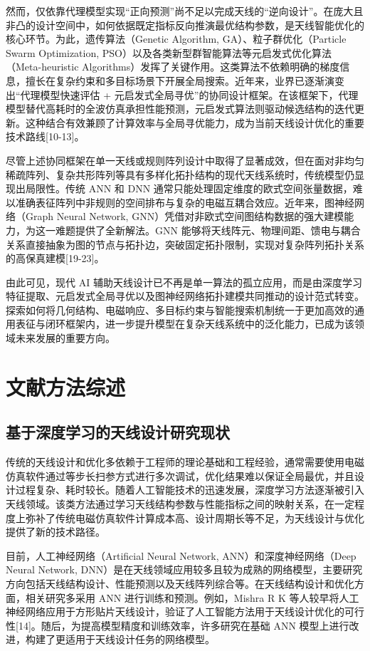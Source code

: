 \documentclass[UTF8,a4paper,12pt]{ctexart}
\begin{document}
然而，仅依靠代理模型实现“正向预测”尚不足以完成天线的“逆向设计”。在庞大且非凸的设计空间中，如何依据既定指标反向推演最优结构参数，是天线智能优化的核心环节。为此，遗传算法（Genetic Algorithm, GA）、粒子群优化（Particle Swarm Optimization, PSO）以及各类新型群智能算法等元启发式优化算法（Meta-heuristic Algorithms）发挥了关键作用。这类算法不依赖明确的梯度信息，擅长在复杂约束和多目标场景下开展全局搜索。近年来，业界已逐渐演变出“代理模型快速评估 + 元启发式全局寻优”的协同设计框架。在该框架下，代理模型替代高耗时的全波仿真承担性能预测，元启发式算法则驱动候选结构的迭代更新。这种结合有效兼顾了计算效率与全局寻优能力，成为当前天线设计优化的重要技术路线[10-13]。

尽管上述协同框架在单一天线或规则阵列设计中取得了显著成效，但在面对非均匀稀疏阵列、复杂共形阵列等具有多样化拓扑结构的现代天线系统时，传统模型仍显现出局限性。传统 ANN 和 DNN 通常只能处理固定维度的欧式空间张量数据，难以准确表征阵列中非规则的空间排布与复杂的电磁互耦合效应。近年来，图神经网络（Graph Neural Network, GNN）凭借对非欧式空间图结构数据的强大建模能力，为这一难题提供了全新解法。GNN 能够将天线阵元、物理间距、馈电与耦合关系直接抽象为图的节点与拓扑边，突破固定拓扑限制，实现对复杂阵列拓扑关系的高保真建模[19-23]。

由此可见，现代 AI 辅助天线设计已不再是单一算法的孤立应用，而是由深度学习特征提取、元启发式全局寻优以及图神经网络拓扑建模共同推动的设计范式转变。探索如何将几何结构、电磁响应、多目标约束与智能搜索机制统一于更加高效的通用表征与闭环框架内，进一步提升模型在复杂天线系统中的泛化能力，已成为该领域未来发展的重要方向。

\section{文献方法综述}

\subsection{基于深度学习的天线设计研究现状}

传统的天线设计和优化多依赖于工程师的理论基础和工程经验，通常需要使用电磁仿真软件通过等步长扫参方式进行多次调试，优化结果难以保证全局最优，并且设计过程复杂、耗时较长。随着人工智能技术的迅速发展，深度学习方法逐渐被引入天线领域。该类方法通过学习天线结构参数与性能指标之间的映射关系，在一定程度上弥补了传统电磁仿真软件计算成本高、设计周期长等不足，为天线设计与优化提供了新的技术路径。

目前，人工神经网络（Artificial Neural Network, ANN）和深度神经网络（Deep Neural Network, DNN）是在天线领域应用较多且较为成熟的网络模型，主要研究方向包括天线结构设计、性能预测以及天线阵列综合等。在天线结构设计和优化方面，相关研究多采用 ANN 进行训练和预测。例如，Mishra R K 等人较早将人工神经网络应用于方形贴片天线设计，验证了人工智能方法用于天线设计优化的可行性[14]。随后，为提高模型精度和训练效率，许多研究在基础 ANN 模型上进行改进，构建了更适用于天线设计任务的网络模型。
\end{document}
